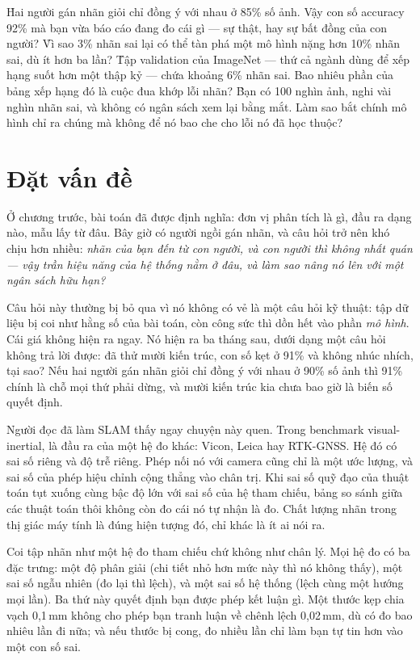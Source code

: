 \documentclass[../../deep_learning.tex]{subfiles}
\begin{document}
\begin{khoigoi}
\h{Hai người gán nhãn giỏi chỉ đồng ý với nhau ở 85\%
 số ảnh. Vậy con số accuracy 92\%
mà bạn vừa báo cáo đang đo cái gì --- sự thật, hay sự bất đồng của con người?}
\h{Vì sao 3\%
 nhãn sai lại có thể tàn phá một mô hình nặng hơn 10\%
nhãn sai, dù ít hơn ba lần?}
\h{Tập validation của ImageNet --- thứ cả ngành dùng để xếp hạng suốt hơn một thập kỷ --- chứa khoảng 6\%
nhãn sai. Bao nhiêu phần của bảng xếp hạng đó là cuộc đua khớp lỗi nhãn?}
\h{Bạn có 100 nghìn ảnh, nghi vài nghìn nhãn sai, và không có ngân sách xem lại bằng mắt. Làm sao bắt chính mô hình chỉ ra chúng mà không để nó bao che cho lỗi nó đã học thuộc?}
\end{khoigoi}

\section{Đặt vấn đề}
Ở chương trước, bài toán đã được định nghĩa: đơn vị phân tích là gì, đầu ra dạng nào, mẫu lấy từ đâu. Bây giờ có người ngồi gán nhãn, và câu hỏi trở nên khó chịu hơn nhiều: \emph{nhãn của bạn đến từ con người, và con người thì không nhất quán — vậy trần hiệu năng của hệ thống nằm ở đâu, và làm sao nâng nó lên với một ngân sách hữu hạn?}

Câu hỏi này thường bị bỏ qua vì nó không có vẻ là một câu hỏi kỹ thuật: tập dữ liệu bị coi như hằng số của bài toán, còn công sức thì dồn hết vào phần \emph{mô hình}. Cái giá không hiện ra ngay. Nó hiện ra ba tháng sau, dưới dạng một câu hỏi không trả lời được: đã thử mười kiến trúc, con số kẹt ở 91\%
 và không nhúc nhích, tại sao? Nếu hai người gán nhãn giỏi chỉ đồng ý với nhau ở 90\%
 số ảnh thì 91\%
chính là chỗ mọi thứ phải dừng, và mười kiến trúc kia chưa bao giờ là biến số quyết định.

Người đọc đã làm SLAM thấy ngay chuyện này quen. Trong benchmark visual-inertial,  là đầu ra của một hệ đo khác: Vicon, Leica hay RTK-GNSS. Hệ đó có sai số riêng và độ trễ riêng. Phép  nối nó với camera cũng chỉ là một ước lượng, và sai số của phép hiệu chỉnh cộng thẳng vào chân trị. Khi sai số quỹ đạo của thuật toán tụt xuống cùng bậc độ lớn với sai số của hệ tham chiếu, bảng so sánh giữa các thuật toán thôi không còn đo cái nó tự nhận là đo. Chất lượng nhãn trong thị giác máy tính là đúng hiện tượng đó, chỉ khác là ít ai nói ra.

\begin{trucgiac}
Coi tập nhãn như một hệ đo tham chiếu chứ không như chân lý. Mọi hệ đo có ba đặc trưng: một độ phân giải (chi tiết nhỏ hơn mức này thì nó không thấy), một sai số ngẫu nhiên (đo lại thì lệch), và một sai số hệ thống (lệch cùng một hướng mọi lần). Ba thứ này quyết định bạn được phép kết luận gì. Một thước kẹp chia vạch 0{,}1\,mm không cho phép bạn tranh luận về chênh lệch 0{,}02\,mm, dù có đo bao nhiêu lần đi nữa; và nếu thước bị cong, đo nhiều lần chỉ làm bạn tự tin hơn vào một con số sai.
\end{trucgiac}
\end{document}
